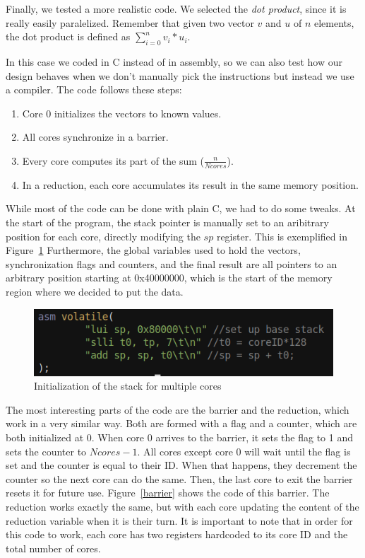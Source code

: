 Finally, we tested a more realistic code.
We selected the \textit{dot product}, since it is really easily paralelized.
Remember that given two vector $v$ and $u$ of $n$ elements, the dot product is defined as $\sum_{i=0}^{n}{v_{i} * u_{i}}$.

In this case we coded in C instead of in assembly, so we can also test how our design behaves when we don't manually pick the instructions but instead we use a compiler.
The code follows these steps:

\begin{enumerate}
	\item Core 0 initializes the vectors to known values.
	\item All cores synchronize in a barrier.
	\item Every core computes its part of the sum ($\frac{n}{Ncores}$).
	\item In a reduction, each core accumulates its result in the same memory position.
\end{enumerate}

While most of the code can be done with plain C, we had to do some tweaks.
At the start of the program, the stack pointer is manually set to an aribitrary position for each core, directly modifying the $sp$ register.
This is exemplified in Figure~\ref{stackfig}
Furthermore, the global variables used to hold the vectors, synchronization flags and counters, and the final result are all pointers to an arbitrary position starting at 0x40000000, which is the start of the memory region where we decided to put the data.

\begin{figure}[h!]
    \centering
    \includegraphics[width=.6\textwidth]{images/stack_ini.png}
    \caption{Initialization of the stack for multiple cores}
    \label{stackfig}
\end{figure}

The most interesting parts of the code are the barrier and the reduction, which work in a very similar way.
Both are formed with a flag and a counter, which are both initialized at 0.
When core 0 arrives to the barrier, it sets the flag to 1 and sets the counter to $Ncores - 1$.
All cores except core 0 will wait until the flag is set and the counter is equal to their ID.
When that happens, they decrement the counter so the next core can do the same.
Then, the last core to exit the barrier resets it for future use.
Figure~\ref{barrier} shows the code of this barrier.
The reduction works exactly the same, but with each core updating the content of the reduction variable when it is their turn. 
It is important to note that in order for this code to work, each core has two registers hardcoded to its core ID and the total number of cores.

